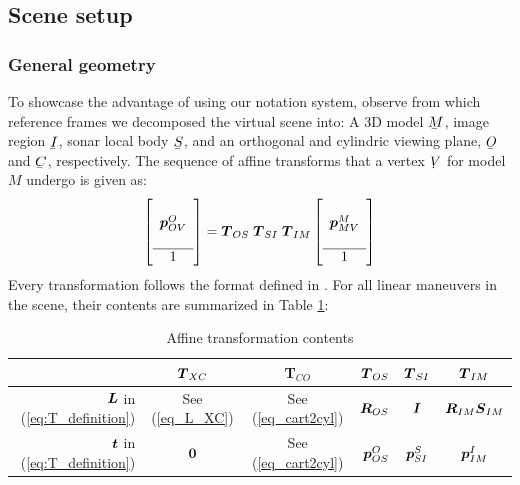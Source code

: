 \subsection{Scene setup}






\subsubsection{General geometry}

To showcase the advantage of using our notation system, observe from  which reference frames we decomposed the virtual scene into: A 3D model $\ubar{M}$, image region $\ubar{I}$, sonar local body $\ubar{S}$, and an orthogonal and cylindric viewing plane, $\ubar{O}$ and $\ubar{C}$, respectively. The sequence of affine transforms that a vertex $\udot{V}$%
for model $M$ undergo is given as:
%
\begin{align}
\left[\begin{array}{c}
\\\boldsymbol{p}_{OV}^{O}\\\\\hline 1
\end{array}\right]
= \boldsymbol{T}_{OS}\;\boldsymbol{T}_{SI}\;\boldsymbol{T}_{IM}
\left[\begin{array}{c}
\\\boldsymbol{p}_{MV}^{M}\\\\\hline 1
\end{array}\right]
\end{align}
%
%
Every transformation follows the format defined in . For all linear maneuvers in the scene, their contents are summarized in Table \ref{tab_transformation_contents}:
%
\begin{table}[h]\normalsize\centering
\begin{tabular}{r c c r c c}
	\hline
	\rowcolor{tabBlue}                     & $\boldsymbol{T}_{XC}$      & T$_{CO}$                & $\boldsymbol{T}_{OS}$      & $\boldsymbol{T}_{SI}$      & $\boldsymbol{T}_{IM}$             \\ \hline
	$\boldsymbol{L}$ in (\ref{eq:T_definition})   & See (\ref{eq_L_XC})      & See (\ref{eq_cart2cyl}) & $\boldsymbol{R}_{OS}$      & $\boldsymbol{I}$           & $\boldsymbol{R}_{IM}\boldsymbol{S}_{IM}$ \\
	$\boldsymbol{t}$  in (\ref{eq:T_definition}) & $\boldsymbol{0}$ & See (\ref{eq_cart2cyl}) & $\boldsymbol{p}_{OS}^{O}$ & $\boldsymbol{p}_{SI}^{S}$ & $\boldsymbol{p}_{IM}^{I}$
\end{tabular}%
\caption{Affine transformation contents}\label{tab_transformation_contents}
\end{table}
